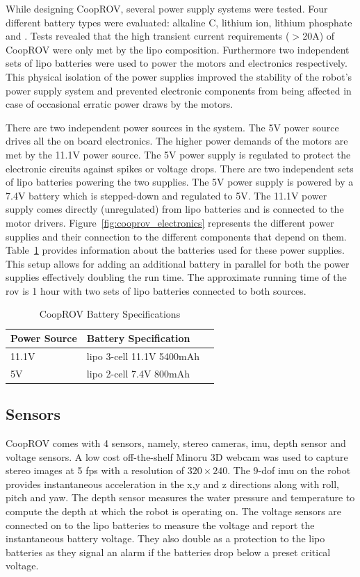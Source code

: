 \documentclass {udthesis}
\begin{document}
While designing CoopROV, several power supply systems were tested. Four different battery types were evaluated: alkaline C, lithium ion, lithium phosphate and . Tests revealed that the high transient current requirements ($>$20A) of CoopROV were only met by the \gls{lipo} composition. Furthermore two independent sets of \gls{lipo} batteries were used to power the motors and electronics respectively. This physical isolation of the power supplies improved the stability of the robot's power supply system and prevented electronic components from being affected in case of occasional erratic power draws by the motors.

There are two independent power sources in the system. The 5V power source drives all the on board electronics. The higher power demands of the motors are met by the 11.1V power source. The 5V power supply is regulated to protect the electronic circuits against spikes or voltage drops. There are two independent sets of \gls{lipo} batteries powering the two supplies. The 5V power supply is powered by a 7.4V battery which is stepped-down and regulated to 5V. The 11.1V power supply comes directly (unregulated) from \gls{lipo} batteries and is connected to the motor drivers. Figure~\ref{fig:cooprov_electronics} represents the different power supplies  and their connection to the different components that depend on them. Table~\ref{tab:cooprov_battery} provides information about the batteries used for these power supplies. This setup allows for adding an additional battery in parallel for both the power supplies effectively doubling the run time. The approximate running time of the \gls{rov} is 1 hour with two 
sets of \gls{lipo} batteries connected to both sources.
%
\begin{table}	\label{tab:cooprov_battery}
\caption{CoopROV Battery Specifications}
  \begin{tabular}{lll} 
  \toprule
  Power Source	&Battery Specification\\
  \midrule
  11.1V	&\gls{lipo} 3-cell 11.1V 5400mAh\\
  5V	&\gls{lipo} 2-cell 7.4V 800mAh\\
  \bottomrule
  \end{tabular}
\end{table}


\subsection{Sensors}

CoopROV comes with 4 sensors, namely, stereo cameras, \gls{imu}, depth sensor and voltage sensors. A low cost off-the-shelf Minoru 3D webcam \cite{minoru} was used to capture stereo images at 5 \gls{fps} with a resolution of $320\times 240$. The 9-\gls{dof} imu on the robot provides instantaneous acceleration in the x,y and z directions along with roll, pitch and yaw. The depth sensor measures the water pressure and temperature to compute the depth at which the robot is operating on. The voltage sensors are connected on to the \gls{lipo} batteries to measure the voltage and report the instantaneous battery voltage. They also double as a protection to the \gls{lipo} batteries as they signal an alarm if the batteries drop below a preset critical voltage.
\end{document}
